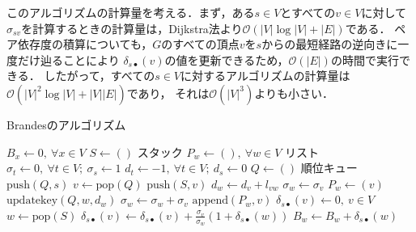 このアルゴリズムの計算量を考える．まず，ある$s\in V$とすべての$v\in V$に対して
$\sigma_{sv}$を計算するときの計算量は，Dijkstra法より$\mathcal{O}(|V|\log |V|+|E|)$である．
ペア依存度の積算についても，$G$のすべての頂点$v$を$s$からの最短経路の逆向きに一度だけ辿ることにより
$\delta_{s\bullet}(v)$の値を更新できるため，$\mathcal{O}(|E|)$の時間で実行できる\cite{Brandes2001}．
したがって，すべての$s\in V$に対するアルゴリズムの計算量は$\mathcal{O}(|V|^2\log |V|+|V||E|)$であり，
それは$\mathcal{O}(|V|^3)$よりも小さい．

\begin{algorithm}[H]
  \caption{Brandesのアルゴリズム}
  \label{algo:brandes}
  \begin{algorithmic}[1]\small
    \State $B_x\gets 0,\:\forall x\in V$
    \State $S\gets()$ \Comment スタック
    \State $P_w\gets (),\:\forall w\in V$ \Comment リスト
    \State $\sigma_t\gets 0,\:\forall t\in V;\:\sigma_s\gets 1$
    \State $d_t\gets -1,\:\forall t\in V;\:d_s\gets 0$
    \State $Q\gets ()$ \Comment 順位キュー
    \State $\mathrm{push}(Q, s)$
    \State $v\gets\mathrm{pop}(Q)$
    \State $\mathrm{push}(S, v)$
    \State $d_w\gets d_v+l_{vw}$
    \State $\sigma_w\gets\sigma_v$
    \State $P_w\gets(v)$
    \State $\mathrm{updatekey}(Q, w, d_w)$
    \EndIf
    \State $\sigma_w\gets\sigma_w+\sigma_v$
    \State $\mathrm{append}(P_w, v)$
    \EndIf
    \EndFor
    \EndWhile
    \State $\delta_{s\bullet}(v)\gets 0,\:v\in V$
    \State $w\gets\mathrm{pop}(S)$
    \State $\delta_{s\bullet}(v)\gets\delta_{s\bullet}(v)+\frac{\sigma_v}{\sigma_w}(1+\delta_{s\bullet}(w))$
    \EndFor
    \State $B_w\gets B_w+\delta_{s\bullet}(w)$
    \EndIf
    \EndWhile
    \EndFor
    \EndProcedure
  \end{algorithmic}
\end{algorithm}

